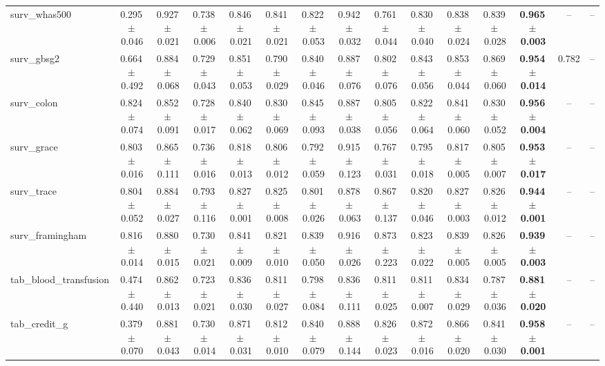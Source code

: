 \documentclass[8pt]{extarticle}
\begin{document}
\begin{longtable}{l*{14}{c}}
surv\_whas500 & 0.295\,$\pm$\,0.046 & 0.927\,$\pm$\,0.021 & 0.738\,$\pm$\,0.006 & 0.846\,$\pm$\,0.021 & 0.841\,$\pm$\,0.021 & 0.822\,$\pm$\,0.053 & 0.942\,$\pm$\,0.032 & 0.761\,$\pm$\,0.044 & 0.830\,$\pm$\,0.040 & 0.838\,$\pm$\,0.024 & 0.839\,$\pm$\,0.028 & \textbf{0.965\,$\pm$\,0.003} & -- & -- \\
surv\_gbsg2 & 0.664\,$\pm$\,0.492 & 0.884\,$\pm$\,0.068 & 0.729\,$\pm$\,0.043 & 0.851\,$\pm$\,0.053 & 0.790\,$\pm$\,0.029 & 0.840\,$\pm$\,0.046 & 0.887\,$\pm$\,0.076 & 0.802\,$\pm$\,0.076 & 0.843\,$\pm$\,0.056 & 0.853\,$\pm$\,0.044 & 0.869\,$\pm$\,0.060 & \textbf{0.954\,$\pm$\,0.014} & 0.782 & -- \\
surv\_colon & 0.824\,$\pm$\,0.074 & 0.852\,$\pm$\,0.091 & 0.728\,$\pm$\,0.017 & 0.840\,$\pm$\,0.062 & 0.830\,$\pm$\,0.069 & 0.845\,$\pm$\,0.093 & 0.887\,$\pm$\,0.038 & 0.805\,$\pm$\,0.056 & 0.822\,$\pm$\,0.064 & 0.841\,$\pm$\,0.060 & 0.830\,$\pm$\,0.052 & \textbf{0.956\,$\pm$\,0.004} & -- & -- \\
surv\_grace & 0.803\,$\pm$\,0.016 & 0.865\,$\pm$\,0.111 & 0.736\,$\pm$\,0.016 & 0.818\,$\pm$\,0.013 & 0.806\,$\pm$\,0.012 & 0.792\,$\pm$\,0.059 & 0.915\,$\pm$\,0.123 & 0.767\,$\pm$\,0.031 & 0.795\,$\pm$\,0.018 & 0.817\,$\pm$\,0.005 & 0.805\,$\pm$\,0.007 & \textbf{0.953\,$\pm$\,0.017} & -- & -- \\
surv\_trace & 0.804\,$\pm$\,0.052 & 0.884\,$\pm$\,0.027 & 0.793\,$\pm$\,0.116 & 0.827\,$\pm$\,0.001 & 0.825\,$\pm$\,0.008 & 0.801\,$\pm$\,0.026 & 0.878\,$\pm$\,0.063 & 0.867\,$\pm$\,0.137 & 0.820\,$\pm$\,0.046 & 0.827\,$\pm$\,0.003 & 0.826\,$\pm$\,0.012 & \textbf{0.944\,$\pm$\,0.001} & -- & -- \\
surv\_framingham & 0.816\,$\pm$\,0.014 & 0.880\,$\pm$\,0.015 & 0.730\,$\pm$\,0.021 & 0.841\,$\pm$\,0.009 & 0.821\,$\pm$\,0.010 & 0.839\,$\pm$\,0.050 & 0.916\,$\pm$\,0.026 & 0.873\,$\pm$\,0.223 & 0.823\,$\pm$\,0.022 & 0.839\,$\pm$\,0.005 & 0.826\,$\pm$\,0.005 & \textbf{0.939\,$\pm$\,0.003} & -- & -- \\
tab\_blood\_transfusion & 0.474\,$\pm$\,0.440 & 0.862\,$\pm$\,0.013 & 0.723\,$\pm$\,0.021 & 0.836\,$\pm$\,0.030 & 0.811\,$\pm$\,0.027 & 0.798\,$\pm$\,0.084 & 0.836\,$\pm$\,0.111 & 0.811\,$\pm$\,0.025 & 0.811\,$\pm$\,0.007 & 0.834\,$\pm$\,0.029 & 0.787\,$\pm$\,0.036 & \textbf{0.881\,$\pm$\,0.020} & -- & -- \\
tab\_credit\_g & 0.379\,$\pm$\,0.070 & 0.881\,$\pm$\,0.043 & 0.730\,$\pm$\,0.014 & 0.871\,$\pm$\,0.031 & 0.812\,$\pm$\,0.010 & 0.840\,$\pm$\,0.079 & 0.888\,$\pm$\,0.144 & 0.826\,$\pm$\,0.023 & 0.872\,$\pm$\,0.016 & 0.866\,$\pm$\,0.020 & 0.841\,$\pm$\,0.030 & \textbf{0.958\,$\pm$\,0.001} & -- & -- \\

\end{longtable}
\end{document}
